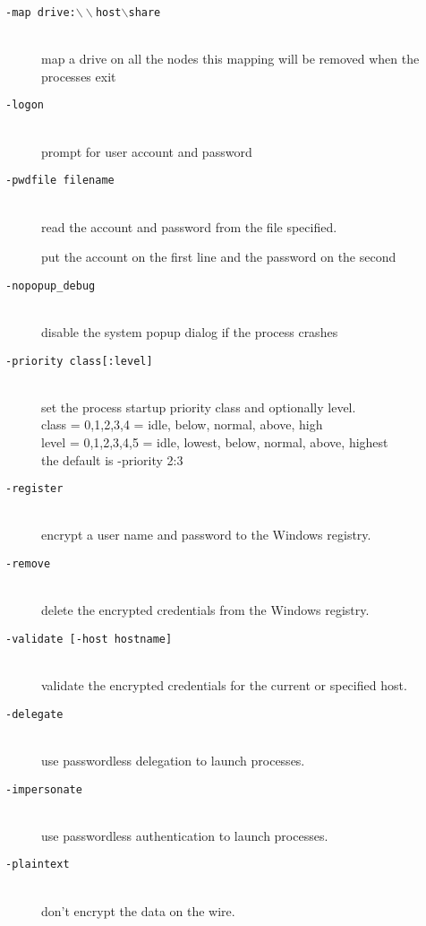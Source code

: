 \documentclass[dvipdfm,11pt]{article}
\begin{document}
\begin{description}
\item[\texttt{-map drive:$\backslash\backslash$host$\backslash$share}]\mbox{}\\
  map a drive on all the nodes
  this mapping will be removed when the processes exit
\item[\texttt{-logon}]\mbox{}\\
  prompt for user account and password
\item[\texttt{-pwdfile filename}]\mbox{}\\
  read the account and password from the file specified.

  put the account on the first line and the password on the second
\item[\texttt{-nopopup\_debug}]\mbox{}\\
  disable the system popup dialog if the process crashes
\item[\texttt{-priority class[:level]}]\mbox{}\\
  set the process startup priority class and optionally level.\mbox{}\\
  class = 0,1,2,3,4   = idle, below, normal, above, high\mbox{}\\
  level = 0,1,2,3,4,5 = idle, lowest, below, normal, above, highest\mbox{}\\
  the default is -priority 2:3
\item[\texttt{-register}]\mbox{}\\
  encrypt a user name and password to the Windows registry.
\item[\texttt{-remove}]\mbox{}\\
  delete the encrypted credentials from the Windows registry.
\item[\texttt{-validate [-host hostname]}]\mbox{}\\
  validate the encrypted credentials for the current or specified host.
\item[\texttt{-delegate}]\mbox{}\\
  use passwordless delegation to launch processes.
\item[\texttt{-impersonate}]\mbox{}\\
  use passwordless authentication to launch processes.
\item[\texttt{-plaintext}]\mbox{}\\
  don't encrypt the data on the wire.
\end{description}
\end{document}
